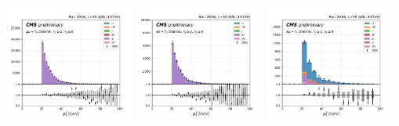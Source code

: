 \begin{frame}{}
\smaller
    \begin{center}
        \includegraphics[width=0.32\textwidth]{chapters/Analysis/sectionCalibration/figures/jetToTauh/mumutau_tauPt_pickles_lltauTight.png}
        \includegraphics[width=0.32\textwidth]{chapters/Analysis/sectionCalibration/figures/jetToTauh/eetau_tauPt_pickles_lltauTight.png}
        \includegraphics[width=0.32\textwidth]{chapters/Analysis/sectionCalibration/figures/jetToTauh/emutau_tauPt_pickles_lltauTight.png}
        

\end{center}
\end{frame}
